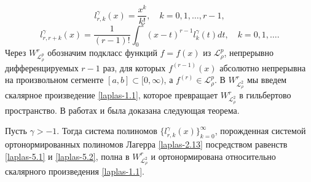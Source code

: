   \begin{equation}\label{laplas-5.1}
l_{r,k}^{\gamma}(x) =\frac{x^k}{k!}, \quad k=0,1,\ldots, r-1,
\end{equation}
  \begin{equation}\label{laplas-5.2}
l_{r,r+k}^{\gamma}(x) =\frac{1}{(r-1)!}\int_{0}^x(x-t)^{r-1}l_{k}^{\gamma}(t)dt, \quad k=0,1,\ldots.
\end{equation}
 Через $W_{\mathcal{ L}_{\rho}^p}^r$ обозначим  подкласс функций $f=f(x)$ из $\mathcal{ L}_{\rho}^p$,
непрерывно дифференцируемых $r-1$ раз, для которых $f^{(r-1)}(x)$
абсолютно непрерывна на произвольном сегменте $[a,b]\subset[0,\infty)$,
а $f^{(r)}\in \mathcal{ L}_{\rho}^p$. В $W_{\mathcal{ L}_{\rho}^2}^r$ мы введем скалярное произведение \eqref{laplas-1.1}, которое превращает $W_{\mathcal{ L}_{\rho}^2}^r$ в гильбертово пространство.
В работах  \cite{laplas-Shar11} и \cite{sobleg-SHII} была доказана следующая теорема.

\begin{theoremA}\label{laplastheo1}
Пусть $\gamma>-1$. Тогда система полиномов $\{l_{r,k}^{\gamma}(x)\}_{k=0}^\infty$, порожденная системой ортонормированных полиномов Лагерра \eqref{laplas-2.13} посредством равенств \eqref{laplas-5.1} и \eqref{laplas-5.2}, полна  в $W^r_{\mathcal{ L}^2_\rho}$ и ортонормирована относительно скалярного произведения \eqref{laplas-1.1}.
\end{theoremA}

